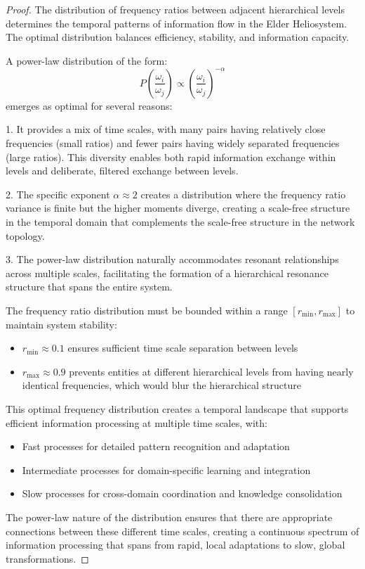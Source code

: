 \begin{proof}
The distribution of frequency ratios between adjacent hierarchical levels determines the temporal patterns of information flow in the Elder Heliosystem. The optimal distribution balances efficiency, stability, and information capacity.

A power-law distribution of the form:
\begin{equation}
P\left(\frac{\omega_i}{\omega_j}\right) \propto \left(\frac{\omega_i}{\omega_j}\right)^{-\alpha}
\end{equation}
emerges as optimal for several reasons:

1. It provides a mix of time scales, with many pairs having relatively close frequencies (small ratios) and fewer pairs having widely separated frequencies (large ratios). This diversity enables both rapid information exchange within levels and deliberate, filtered exchange between levels.

2. The specific exponent $\alpha \approx 2$ creates a distribution where the frequency ratio variance is finite but the higher moments diverge, creating a scale-free structure in the temporal domain that complements the scale-free structure in the network topology.

3. The power-law distribution naturally accommodates resonant relationships across multiple scales, facilitating the formation of a hierarchical resonance structure that spans the entire system.

The frequency ratio distribution must be bounded within a range $[r_{\min}, r_{\max}]$ to maintain system stability:
\begin{itemize}
    \item $r_{\min} \approx 0.1$ ensures sufficient time scale separation between levels
    \item $r_{\max} \approx 0.9$ prevents entities at different hierarchical levels from having nearly identical frequencies, which would blur the hierarchical structure
\end{itemize}

This optimal frequency distribution creates a temporal landscape that supports efficient information processing at multiple time scales, with:
\begin{itemize}
    \item Fast processes for detailed pattern recognition and adaptation
    \item Intermediate processes for domain-specific learning and integration
    \item Slow processes for cross-domain coordination and knowledge consolidation
\end{itemize}

The power-law nature of the distribution ensures that there are appropriate connections between these different time scales, creating a continuous spectrum of information processing that spans from rapid, local adaptations to slow, global transformations.
\end{proof}

